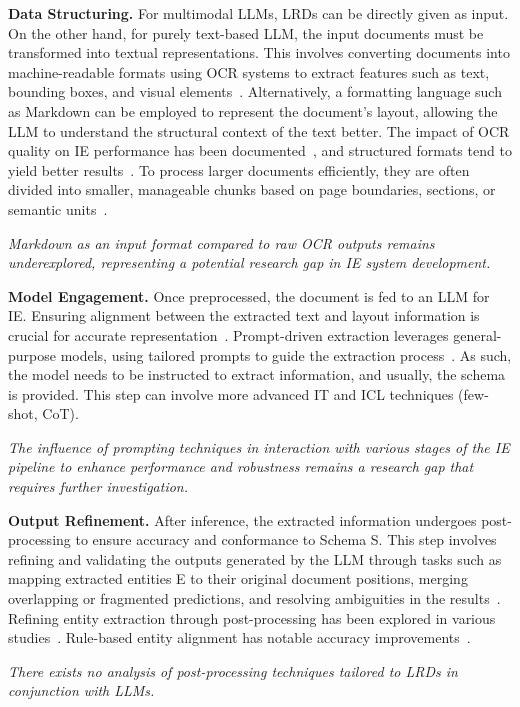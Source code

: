 \noindent \textbf{Data Structuring.} For multimodal LLMs, LRDs can be directly given as input. On the other hand, for purely text-based LLM, the input documents must be transformed into textual representations. This involves converting documents into machine-readable formats using OCR systems to extract features such as text, bounding boxes, and visual elements~\cite{mieskes-schmunk-2019-ocr, smith2007overview}. Alternatively, a formatting language such as Markdown can be employed to represent the document's layout, allowing the LLM to understand the structural context of the text better.
The impact of OCR quality on IE performance has been documented~\cite{bhadauria-etal-2024-effects}, and structured formats tend to yield better results~\cite{bai-etal-2024-schema}.
To process larger documents efficiently, they are often divided into smaller, manageable chunks based on page boundaries, sections, or semantic units~\cite{liu2024lost}.
\colorbox{blue!10}{\parbox{\columnwidth}{\emph{Markdown as an input format compared to raw OCR outputs remains underexplored, representing a potential research gap in IE system development.}}}

\noindent \textbf{Model Engagement.} Once preprocessed, the document is fed to an LLM for IE.  Ensuring alignment between the extracted text and layout information is crucial for accurate representation~\cite{xu2020layoutlmv2, appalaraju2021docformer}. Prompt-driven extraction leverages general-purpose models, using tailored prompts to guide the extraction process~\cite{brown2020language, radford2021learning, zhou2022least}. 
As such, the model needs to be instructed to extract information, and usually, the schema is provided. This step can involve more advanced IT and ICL techniques (few-shot, CoT).
\colorbox{blue!10}{\parbox{\columnwidth}{\emph{The influence of prompting techniques in interaction with various stages of the IE pipeline to enhance performance and robustness remains a research gap that requires further investigation.}}}

\noindent \textbf{Output Refinement.} After inference, the extracted information undergoes post-processing to ensure accuracy and conformance to Schema S. This step involves refining and validating the outputs generated by the LLM through tasks such as mapping extracted entities E to their original document positions, merging overlapping or fragmented predictions, and resolving ambiguities in the results~\cite{xu2020layoutlm}. 
Refining entity extraction through post-processing has been explored in various studies~\cite{j-wang-etal-2022-globalpointer, tamayo-etal-2022-nlp}. Rule-based entity alignment has notable accuracy improvements~\cite{luo2024asgeaexploitinglogicrules}.
\colorbox{blue!10}{\parbox{\columnwidth}{\emph{There exists no analysis of post-processing techniques tailored to LRDs in conjunction with LLMs.
}}}








